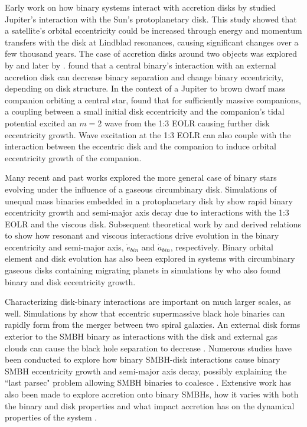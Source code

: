 Early work on how binary systems interact with accretion disks by \citet{Goldreich1980} studied Jupiter's interaction with the Sun's protoplanetary disk.  This study showed that a satellite's orbital eccentricity could be increased through energy and momentum transfers with the disk at Lindblad resonances, causing significant changes over a few thousand years.  The case of accretion disks around two objects was explored by \citet{Pringle1991} and later by \citet{Papaloizou2001}.  \citet{Pringle1991} found that a central binary's interaction with an external accretion disk can decrease binary separation and change binary eccentricity, depending on disk structure.  In the context of a Jupiter to brown dwarf mass companion orbiting a central star,  \citet{Papaloizou2001} found that for sufficiently massive companions, a coupling between a small initial disk eccentricity and the companion's
tidal potential excited an $m = 2$ wave from the 1:3 EOLR causing further disk eccentricity growth.  Wave excitation at the 1:3 EOLR can also couple with the interaction between the eccentric disk and the companion to induce orbital eccentricity growth of the companion.  

Many recent and past works explored the more general case of binary stars evolving under the influence of a gaseous circumbinary disk.  Simulations of unequal mass binaries embedded in a protoplanetary disk by \citet{Artymowicz1991} show rapid binary eccentricity growth and semi-major axis decay due to interactions with the 1:3 EOLR and the viscous disk.  Subsequent theoretical work by \citet{Artymowicz1996b} and \citet{Artymowicz2000} derived relations to show how resonant and viscous interactions drive evolution in the binary eccentricity and semi-major axis, $\dot{e}_{bin}$ and $\dot{a}_{bin}$, respectively.  Binary orbital element and disk evolution has also been explored in systems with circumbinary gaseous disks containing migrating planets in simulations by \citet{Pierens2007} who also found binary and disk eccentricity growth.

Characterizing disk-binary interactions are important on much larger scales, as well.  Simulations by \citet{Mayer2007} show that eccentric supermassive
black hole binaries can rapidly form from the merger between two spiral galaxies.  An external disk forms exterior to the SMBH binary
as interactions with the disk and external gas clouds can cause the black hole separation to decrease \citep{Roskar2015}.  Numerous studies have been 
conducted to explore how binary SMBH-disk interactions cause binary SMBH eccentricity growth and semi-major axis decay, possibly 
explaining the ``last parsec" problem allowing SMBH binaries to coalesce \citep[e.g.][]{Armitage2005,Escala2005,Cuadra2009,Roedig2012,Aly2015}.  Extensive work
has also been made to explore accretion onto binary SMBHs, how it varies with both the binary and disk properties and what impact accretion
has on the dynamical properties of the system \citep[e.g.][]{Shi2012,DOrazio2013,Nixon2013,Farris2014}.
 
